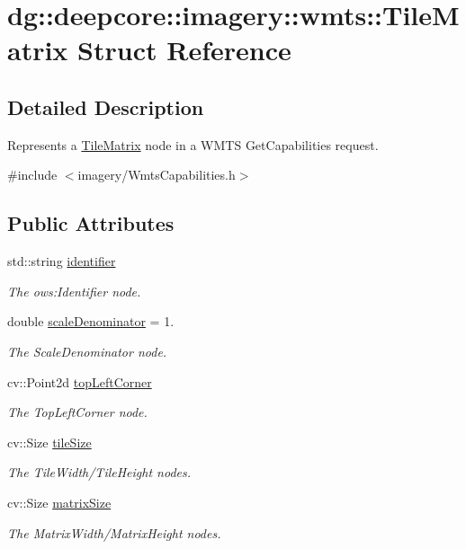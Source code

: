 \hypertarget{structdg_1_1deepcore_1_1imagery_1_1wmts_1_1_tile_matrix}{}\section{dg\+:\+:deepcore\+:\+:imagery\+:\+:wmts\+:\+:Tile\+Matrix Struct Reference}
\label{structdg_1_1deepcore_1_1imagery_1_1wmts_1_1_tile_matrix}


\subsection{Detailed Description}
Represents a \hyperlink{structdg_1_1deepcore_1_1imagery_1_1wmts_1_1_tile_matrix}{Tile\+Matrix} node in a W\+M\+TS Get\+Capabilities request. 

{\ttfamily \#include $<$imagery/\+Wmts\+Capabilities.\+h$>$}

\subsection*{Public Attributes}
\begin{DoxyCompactItemize}
\item 
std\+::string \hyperlink{structdg_1_1deepcore_1_1imagery_1_1wmts_1_1_tile_matrix_a86b15e6a28c6ade6c2059d6c52473eaa}{identifier}
\begin{DoxyCompactList}\small\item\em The ows\+:Identifier node. \end{DoxyCompactList}\item 
double \hyperlink{structdg_1_1deepcore_1_1imagery_1_1wmts_1_1_tile_matrix_a111edc4eea402d1a9e40f60f0d673ece}{scale\+Denominator} = 1.
\begin{DoxyCompactList}\small\item\em The Scale\+Denominator node. \end{DoxyCompactList}\item 
cv\+::\+Point2d \hyperlink{structdg_1_1deepcore_1_1imagery_1_1wmts_1_1_tile_matrix_ac821a1a8a6db19c1a91f564b99fcc33f}{top\+Left\+Corner}
\begin{DoxyCompactList}\small\item\em The Top\+Left\+Corner node. \end{DoxyCompactList}\item 
cv\+::\+Size \hyperlink{structdg_1_1deepcore_1_1imagery_1_1wmts_1_1_tile_matrix_ace8dcd0a02171503108255096eac224f}{tile\+Size}
\begin{DoxyCompactList}\small\item\em The Tile\+Width/\+Tile\+Height nodes. \end{DoxyCompactList}\item 
cv\+::\+Size \hyperlink{structdg_1_1deepcore_1_1imagery_1_1wmts_1_1_tile_matrix_a2a8b014ac1759efe664e5f6b609182e4}{matrix\+Size}
\begin{DoxyCompactList}\small\item\em The Matrix\+Width/\+Matrix\+Height nodes. \end{DoxyCompactList}\end{DoxyCompactItemize}


